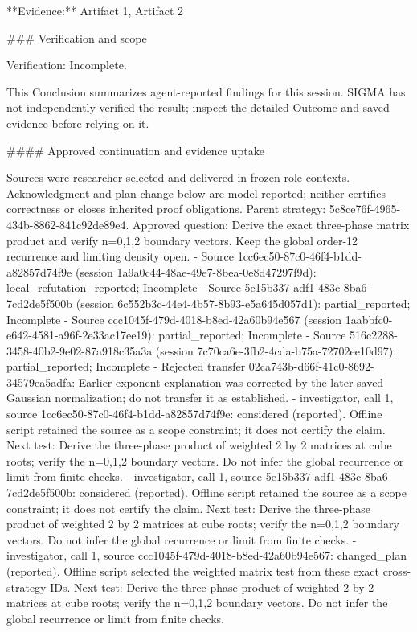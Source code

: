 \documentclass[11pt]{article}
\begin{document}
**Evidence:** Artifact 1, Artifact 2

\#\#\# Verification and scope

Verification: Incomplete.

This Conclusion summarizes agent-reported findings for this session. SIGMA has not independently verified the result; inspect the detailed Outcome and saved evidence before relying on it.

\#\#\#\# Approved continuation and evidence uptake

Sources were researcher-selected and delivered in frozen role contexts. Acknowledgment and plan change below are model-reported; neither certifies correctness or closes inherited proof obligations.
Parent strategy: 5c8ce76f-4965-434b-8862-841c92de89e4. Approved question: Derive the exact three-phase matrix product and verify n=0,1,2 boundary vectors. Keep the global order-12 recurrence and limiting density open.
- Source 1cc6ec50-87c0-46f4-b1dd-a82857d74f9e (session 1a9a0c44-48ae-49e7-8bea-0e8d47297f9d): local\_refutation\_reported; Incomplete
- Source 5e15b337-adf1-483c-8ba6-7cd2de5f500b (session 6c552b3c-44e4-4b57-8b93-e5a645d057d1): partial\_reported; Incomplete
- Source ccc1045f-479d-4018-b8ed-42a60b94e567 (session 1aabbfc0-e642-4581-a96f-2e33ac17ee19): partial\_reported; Incomplete
- Source 516c2288-3458-40b2-9e02-87a918c35a3a (session 7c70ca6e-3fb2-4cda-b75a-72702ee10d97): partial\_reported; Incomplete
- Rejected transfer 02ca743b-d66f-41c0-8692-34579ea5adfa: Earlier exponent explanation was corrected by the later saved Gaussian normalization; do not transfer it as established.
- investigator, call 1, source 1cc6ec50-87c0-46f4-b1dd-a82857d74f9e: considered (reported). Offline script retained the source as a scope constraint; it does not certify the claim. Next test: Derive the three-phase product of weighted 2 by 2 matrices at cube roots; verify the n=0,1,2 boundary vectors. Do not infer the global recurrence or limit from finite checks.
- investigator, call 1, source 5e15b337-adf1-483c-8ba6-7cd2de5f500b: considered (reported). Offline script retained the source as a scope constraint; it does not certify the claim. Next test: Derive the three-phase product of weighted 2 by 2 matrices at cube roots; verify the n=0,1,2 boundary vectors. Do not infer the global recurrence or limit from finite checks.
- investigator, call 1, source ccc1045f-479d-4018-b8ed-42a60b94e567: changed\_plan (reported). Offline script selected the weighted matrix test from these exact cross-strategy IDs. Next test: Derive the three-phase product of weighted 2 by 2 matrices at cube roots; verify the n=0,1,2 boundary vectors. Do not infer the global recurrence or limit from finite checks.
\end{document}
